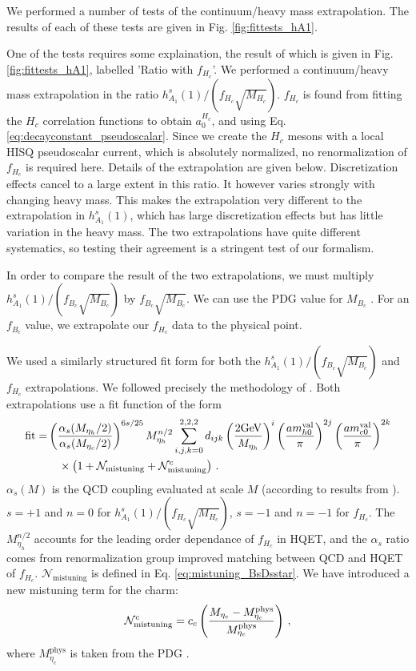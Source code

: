 We performed a number of tests of the continuum/heavy mass extrapolation. The results of each of these tests are given in Fig. \ref{fig:fittests_hA1}.

One of the tests requires some explaination, the result of which is given in Fig. \ref{fig:fittests_hA1}, labelled 'Ratio with $f_{H_c}$'. We performed a continuum/heavy mass extrapolation in the ratio $h_{A_1}^s(1)/(f_{H_c}\sqrt{M_{H_c}})$. $f_{H_c}$ is found from fitting the $H_c$ correlation functions to obtain $a_0^{H_c}$, and using Eq. \eqref{eq:decayconstant_pseudoscalar}. Since we create the $H_c$ mesons with a local HISQ pseudoscalar current, which is absolutely normalized, no renormalization of $f_{H_c}$ is required here. Details of the extrapolation are given below. Discretization effects cancel to a large extent in this ratio. It however varies strongly with changing heavy mass. This makes the extrapolation very different to the extrapolation in $h_{A_1}^s(1)$, which has large discretization effects but has little variation in the heavy mass. The two extrapolations have quite different systematics, so testing their agreement is a stringent test of our formalism.

In order to compare the result of the two extrapolations, we must multiply $h_{A_1}^s(1)/(f_{B_c}\sqrt{M_{B_c}})$ by $f_{B_c}\sqrt{M_{B_c}}$. We can use the PDG value for $M_{B_c}$ \cite{PhysRevD.98.030001}. For an $f_{B_c}$ value, we extrapolate our $f_{H_c}$ data to the physical point.

We used a similarly structured fit form for both the $h_{A_1}^s(1)/(f_{B_c}\sqrt{M_{B_c}})$ and $f_{H_c}$ extrapolations. We followed precisely the methodology of \cite{McNeile:2012qf}. Both extrapolations use a fit function of the form
\begin{align}
  \label{eq:fitfun_ratio}
  \nonumber
  \text{fit} = &\left({\alpha_s(M_{\eta_h}/2)\over\alpha_s(M_{\eta_c}/2)}\right)^{6s/25} M_{\eta_h}^{n/2} \sum_{i,j,k=0}^{2,2,2} d_{ijk} \left({2\text{GeV}\over M_{\eta_h} }\right)^{i} \left({ am^{\text{val}}_{h0} \over \pi }\right)^{2j} \left({ am^{\text{val}}_{c0} \over \pi }\right)^{2k} \\
  &\quad \times\left( 1 + \mathcal{N}_{\text{mistuning}} + \mathcal{N}^c_{\text{mistuning}} \right)\,.
\end{align}
$\alpha_s(M)$ is the QCD coupling evaluated at scale $M$ (according to results from \cite{Chakraborty:2014aca}). $s=+1$ and $n=0$ for $h_{A_1}^s(1)/(f_{H_c}\sqrt{M_{H_c}})$, $s=-1$ and $n=-1$ for $f_{H_c}$. The $M_{\eta_h}^{n/2}$ accounts for the leading order dependance of $f_{H_c}$ in HQET, and the $\alpha_s$ ratio comes from renormalization group improved matching between QCD and HQET of $f_{H_c}$. $\mathcal{N}_{\text{mistuning}}$ is defined in Eq. \eqref{eq:mistuning_BsDsstar}. We have introduced a new mistuning term for the charm:
\begin{align}
  \mathcal{N}^c_{\text{mistuning}} = c_c \left({M_{\eta_c}-M_{\eta_c}^{\text{phys}}\over M_{\eta_c}^{\text{phys}}}\right)\,,
  \label{eq:charmmistuning_BsDsstar}
\end{align}
where $M_{\eta_c}^{\text{phys}}$ is taken from the PDG \cite{PhysRevD.98.030001}.

